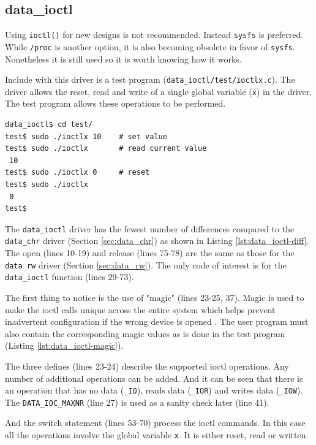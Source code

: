 \documentclass{article}
\begin{document}

\subsection{data\_ioctl}

Using \verb+ioctl()+ for new designs is not recommended\autocite[Pg. 156]{corbet2009linux}\autocite{love2010linux}.
Instead \verb+sysfs+ is preferred.
While \verb+/proc+ is another option, it is also becoming obsolete in
favor of \verb+sysfs+.
Nonetheless it is still used so it is worth knowing how it works.

Include with this driver is a test program (\verb+data_ioctl/test/ioctlx.c+).
The driver allows the reset, read and write of a single global variable
(\verb+x+) in the driver.
The test program allows these operations to be performed.

\begin{verbatim}
data_ioctl$ cd test/
test$ sudo ./ioctlx 10    # set value
test$ sudo ./ioctlx       # read current value
 10
test$ sudo ./ioctlx 0     # reset
test$ sudo ./ioctlx
 0
test$
\end{verbatim}

The \verb+data_ioctl+ driver has the fewest number of differences compared to
the \verb+data_chr+ driver (Section \ref{sec:data_chr}) as shown
in Listing \ref{lst:data_ioctl-diff}.
The open (lines 10-19) and release (lines 75-78) are the same as
those for the \verb+data_rw+ driver (Section \ref{sec:data_rw}).
The only code of interest is for the \verb+data_ioctl+ function (lines 29-73).

The first thing to notice is the use of "magic" (lines 23-25, 37).
Magic is used to make the ioctl calls unique across the entire system
which helps prevent inadvertent configuration if the wrong device is opened
\autocite[Pg. 158]{corbet2009linux}.
The user program must also contain the corresponding magic
values as is done in the test program (Listing \ref{lst:data_ioctl-magic}).

The three defines (lines 23-24) describe the supported ioctl operations.
Any number of additional operations can be added.
And it can be seen that there is an operation that has no data (\verb+_IO+),
reads data (\verb+_IOR+) and writes data (\verb+_IOW+).
The \verb+DATA_IOC_MAXNR+ (line 27) is used as a sanity check later (line 41).

And the switch statement (lines 53-70) process the ioctl commands.
In this case all the operations involve the global variable \verb+x+.
It is either reset, read or written.
\end{document}

